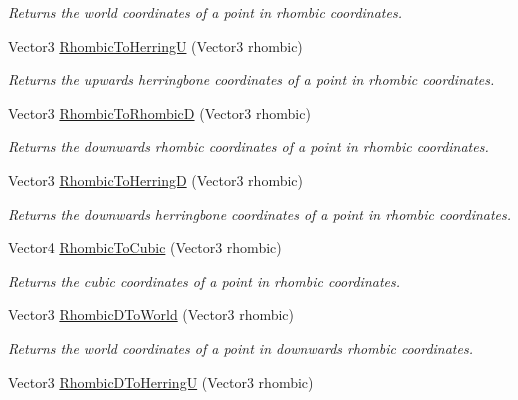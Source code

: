 \begin{DoxyCompactItemize}
\begin{DoxyCompactList}\small\item\em Returns the world coordinates of a point in rhombic coordinates.\end{DoxyCompactList}\item 
Vector3 \hyperlink{class_g_f_hex_grid_a95e3f6b72b073af645cd7ebe301a133c_a95e3f6b72b073af645cd7ebe301a133c}{Rhombic\+To\+Herring\+U} (Vector3 rhombic)
\begin{DoxyCompactList}\small\item\em Returns the upwards herringbone coordinates of a point in rhombic coordinates.\end{DoxyCompactList}\item 
Vector3 \hyperlink{class_g_f_hex_grid_ad7bf26ea21e55594a011899d72a1a305_ad7bf26ea21e55594a011899d72a1a305}{Rhombic\+To\+Rhombic\+D} (Vector3 rhombic)
\begin{DoxyCompactList}\small\item\em Returns the downwards rhombic coordinates of a point in rhombic coordinates.\end{DoxyCompactList}\item 
Vector3 \hyperlink{class_g_f_hex_grid_a3d2722a9ce23d0769ae92812ecdecb34_a3d2722a9ce23d0769ae92812ecdecb34}{Rhombic\+To\+Herring\+D} (Vector3 rhombic)
\begin{DoxyCompactList}\small\item\em Returns the downwards herringbone coordinates of a point in rhombic coordinates.\end{DoxyCompactList}\item 
Vector4 \hyperlink{class_g_f_hex_grid_a1ff9f3d11d707bc0d434d07a2df92549_a1ff9f3d11d707bc0d434d07a2df92549}{Rhombic\+To\+Cubic} (Vector3 rhombic)
\begin{DoxyCompactList}\small\item\em Returns the cubic coordinates of a point in rhombic coordinates.\end{DoxyCompactList}\item 
Vector3 \hyperlink{class_g_f_hex_grid_aae1b996c067ade686279c48f6588cf08_aae1b996c067ade686279c48f6588cf08}{Rhombic\+D\+To\+World} (Vector3 rhombic)
\begin{DoxyCompactList}\small\item\em Returns the world coordinates of a point in downwards rhombic coordinates.\end{DoxyCompactList}\item 
Vector3 \hyperlink{class_g_f_hex_grid_a0f748078789813bf09541328e0aaae53_a0f748078789813bf09541328e0aaae53}{Rhombic\+D\+To\+Herring\+U} (Vector3 rhombic)

\end{DoxyCompactItemize}
